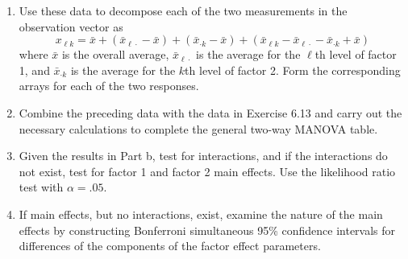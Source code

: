 \begin{enumerate}[label= (\alph*)]
    \item Use these data to decompose each of the two measurements in the observation
    vector as
    \[
        x_{\ell k}
        =
        \bar{x}
        +
        (
            \bar{x}_{\ell \cdot}
            -
            \bar{x}
        )
        +
        (
            \bar{x}_{\cdot k}
            -
            \bar{x}
        )
        +
        (
            \bar{x}_{\ell k}
            -
            \bar{x}_{\ell \cdot}
            -
            \bar{x}_{\cdot k}
            +
            \bar{x}
        )
    \]
    where $\bar{x}$ is the overall average, $\bar{x}_{\ell \cdot}$ is the average for the $\ell$th
level of factor 1, and $\bar{x}_{\cdot k}$ is the average for the $k$th level of factor 2. Form the corresponding arrays for each of the two responses.
    \item Combine the preceding data with the data in Exercise 6.13 and carry out the necessary
    calculations to complete the general two-way MANOVA table.
    \item Given the results in Part b, test for interactions, and if the interactions do not
    exist, test for factor 1 and factor 2 main effects. Use the likelihood ratio test with
    $\alpha= .05$.
    \item If main effects, but no interactions, exist, examine the nature of the main effects by
    constructing Bonferroni simultaneous 95\% confidence intervals for differences of
    the components of the factor effect parameters.
\end{enumerate}